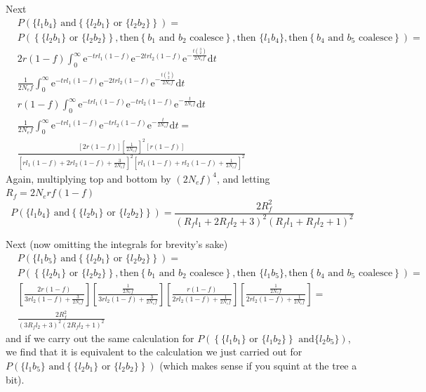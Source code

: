 \documentclass[reqno]{amsart}
\begin{document}
Next
\begin{align}
	& P(\{l_1b_4\} \text{ and} \left\{\{l_2b_1\} \text{ or } \{l_2b_2\}\right\}) = \\
	& P(\left\{\{l_2 b_1\} \text{ or } \{l_2 b_2\}\right\}, \text{then} \left\{b_1 \text{ and } b_2 \text{ coalesce}\right\}, \text {then } \{l_1b_4\}, \text{then} \left\{b_4 \text{ and } b_5 \text{ coalesce} \right\}) = \\
	& 2r(1-f) \int_0^\infty \mathrm{e}^{-trl_1(1-f)}\mathrm{e}^{-2trl_2(1-f)}\mathrm{e}^{-\frac{t\binom{3}{2}}{2N_ef}}\mathrm{d}t \\
	& \frac{1}{2N_ef} \int_0^\infty \mathrm{e}^{-trl_1(1-f)}\mathrm{e}^{-2trl_2(1-f)}\mathrm{e}^{-\frac{t\binom{3}{2}}{2N_ef}}\mathrm{d}t \\
	& r(1-f) \int_0^\infty \mathrm{e}^{-trl_1(1-f)}\mathrm{e}^{-trl_2(1-f)}\mathrm{e}^{-\frac{t}{2N_ef}}\mathrm{d}t \\
	& \frac{1}{2N_ef} \int_0^\infty \mathrm{e}^{-trl_1(1-f)}\mathrm{e}^{-trl_2(1-f)}\mathrm{e}^{-\frac{t}{2N_ef}}\mathrm{d}t = \\
	& \frac{\left[2r(1-f)\right]\left[\frac{1}{2N_ef}\right]^2\left[r(1-f)\right]}{\left[rl_1 (1-f) + 2r l_2 (1-f) + \frac{3}{2N_ef}\right]^2\left[r l_1 (1-f) + r l_2 (1-f) + \frac{1}{2N_e f} \right]^2}
\end{align}
Again, multiplying top and bottom by $\left(2N_ef\right)^4$, and letting $R_f = 2N_erf(1-f)$
\begin{equation}
	P(\{l_1b_4\} \text{ and} \left\{\{l_2b_1\} \text{ or } \{l_2b_2\}\right\}) = \frac{2R_f^2}{\left(R_f l_1 + 2R_f l_2 + 3\right)^2\left(R_f l_1 + R_f l_2 + 1\right)^2}
\end{equation}

Next (now omitting the integrals for brevity's sake)
\begin{align}
	& P(\{l_1b_5\} \text{ and} \left\{\{l_2b_1\} \text{ or } \{l_2b_2\}\right\}) = \\
	& P(\left\{\{l_2 b_1\} \text{ or } \{l_2 b_2\}\right\}, \text{then} \left\{b_1 \text{ and } b_2 \text{ coalesce}\right\}, \text {then } \{l_1b_5\}, \text{then} \left\{b_4 \text{ and } b_5 \text{ coalesce} \right\}) = \\
	& \left[\frac{2r(1-f)}{3rl_2(1-f) + \frac{3}{2N_ef}}\right] \left[\frac{\frac{1}{2N_ef}}{3rl_2(1-f) + \frac{3}{2N_ef}}\right] \left[\frac{r(1-f)}{2rl_2(1-f) + \frac{1}{2N_ef}}\right] \left[\frac{\frac{1}{2N_ef}}{2rl_2(1-f) + \frac{1}{2N_ef}}\right] = \\
	& \frac{2R_f^2}{\left(3R_f l_2 + 3\right)^2\left(2R_f l_2 + 1 \right)^2}
\end{align}
and if we carry out the same calculation for $P(\left\{\{l_1b_1\} \text{ or } \{l_1b_2\}\right\} \text{ and} \{l_2b_5\})$, we find that it is equivalent to the calculation we just carried out for $P(\{l_1b_5\} \text{ and} \left\{\{l_2b_1\} \text{ or } \{l_2b_2\}\right\})$ (which makes sense if you squint at the tree a bit).
\end{document}
